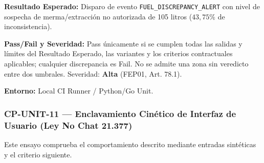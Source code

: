 \par\noindent\textbf{Resultado Esperado:} Disparo de evento \texttt{F\allowbreak{}U\allowbreak{}E\allowbreak{}L\allowbreak{}\_\allowbreak{}D\allowbreak{}I\allowbreak{}S\allowbreak{}C\allowbreak{}R\allowbreak{}E\allowbreak{}P\allowbreak{}A\allowbreak{}N\allowbreak{}C\allowbreak{}Y\allowbreak{}\_\allowbreak{}A\allowbreak{}L\allowbreak{}E\allowbreak{}R\allowbreak{}T\allowbreak{}} con nivel de sospecha de merma/extracción no autorizada de 105 litros (\(43{,}75\%\) de inconsistencia).\par
\par\noindent\textbf{Pass/Fail y Severidad:} Pass únicamente si se cumplen todas las salidas y límites del Resultado Esperado, las variantes y los criterios contractuales aplicables; cualquier discrepancia es Fail. No se admite una zona sin veredicto entre dos umbrales. Severidad: \textbf{Alta} (FEP01, Art. 78.1).\par
\par\noindent\textbf{Entorno:} Local CI Runner / Python/Go Unit.\par






\subsubsection*{CP-UNIT-11 — Enclavamiento Cinético de Interfaz de Usuario (Ley No Chat 21.377)}\label{sec:9-cp-unit-11}
Este ensayo comprueba el comportamiento descrito mediante entradas sintéticas y el criterio siguiente.

